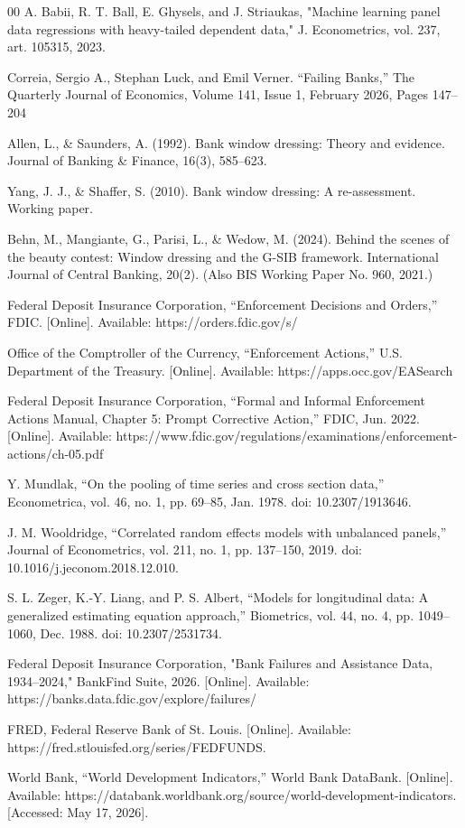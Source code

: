 \documentclass[conference]{IEEEtran}
\begin{document}
\begin{thebibliography}{00}
 A. Babii, R. T. Ball, E. Ghysels, and J. Striaukas, "Machine learning panel data regressions with heavy-tailed dependent data," J. Econometrics, vol. 237, art. 105315, 2023.

 Correia, Sergio A., Stephan Luck, and Emil Verner. “Failing Banks,” The Quarterly Journal of Economics, Volume 141, Issue 1, February 2026, Pages 147–204

 Allen, L., \& Saunders, A. (1992). Bank window dressing: Theory and evidence. Journal of Banking \& Finance, 16(3), 585–623.

 Yang, J. J., \& Shaffer, S. (2010). Bank window dressing: A re-assessment. Working paper.

 Behn, M., Mangiante, G., Parisi, L., \& Wedow, M. (2024). Behind the scenes of the beauty contest: Window dressing and the G-SIB framework. International Journal of Central Banking, 20(2). (Also BIS Working Paper No. 960, 2021.)

 Federal Deposit Insurance Corporation, “Enforcement Decisions and Orders,” FDIC. [Online]. Available: https://orders.fdic.gov/s/

 Office of the Comptroller of the Currency, “Enforcement Actions,” U.S. Department of the Treasury. [Online]. Available: https://apps.occ.gov/EASearch

 Federal Deposit Insurance Corporation, “Formal and Informal Enforcement Actions Manual, Chapter 5: Prompt Corrective Action,” FDIC, Jun. 2022. [Online]. Available: https://www.fdic.gov/regulations/examinations/enforcement-actions/ch-05.pdf

 Y. Mundlak, “On the pooling of time series and cross section data,” Econometrica, vol. 46, no. 1, pp. 69–85, Jan. 1978. doi: 10.2307/1913646.

 J. M. Wooldridge, “Correlated random effects models with unbalanced panels,” Journal of Econometrics, vol. 211, no. 1, pp. 137–150, 2019. doi: 10.1016/j.jeconom.2018.12.010.

 S. L. Zeger, K.-Y. Liang, and P. S. Albert, “Models for longitudinal data: A generalized estimating equation approach,” Biometrics, vol. 44, no. 4, pp. 1049–1060, Dec. 1988. doi: 10.2307/2531734.

 Federal Deposit Insurance Corporation, "Bank Failures and Assistance Data, 1934–2024," BankFind Suite, 2026. [Online]. Available: https://banks.data.fdic.gov/explore/failures/

 FRED, Federal Reserve Bank of St. Louis. [Online]. Available: https://fred.stlouisfed.org/series/FEDFUNDS. 

 World Bank, “World Development Indicators,” World Bank DataBank. [Online]. Available: https://databank.worldbank.org/source/world-development-indicators. [Accessed: May 17, 2026].


\end{thebibliography}
\end{document}
